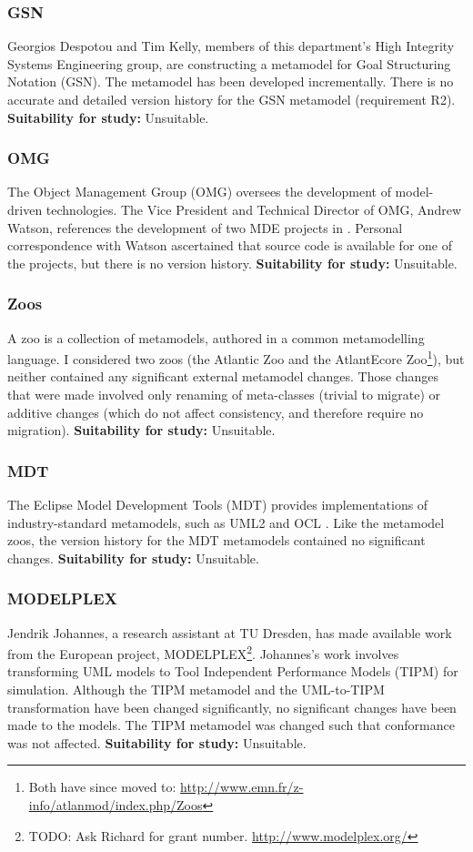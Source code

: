\subsubsection{GSN}
\label{par:gsn}
Georgios Despotou and Tim Kelly, members of this department's High Integrity Systems Engineering group, are constructing a metamodel for Goal Structuring Notation (GSN). The metamodel has been developed incrementally. There is no accurate and detailed version history for the GSN metamodel (requirement R2). \textbf{Suitability for study:} Unsuitable.

\subsubsection{OMG}
\label{par:omg}
The Object Management Group (OMG) \cite{omg} oversees the development of model-driven technologies. The Vice President and Technical Director of OMG, Andrew Watson, references the development of two MDE projects in \cite{watson08mdahistory}. Personal correspondence with Watson ascertained that source code is available for one of the projects, but there is no version history. \textbf{Suitability for study:} Unsuitable.

\subsubsection{Zoos}
\label{par:zoos}
A zoo is a collection of metamodels, authored in a common metamodelling language. I considered two zoos (the Atlantic Zoo and the AtlantEcore Zoo\footnote{Both have since moved to: \url{http://www.emn.fr/z-info/atlanmod/index.php/Zoos}}), but neither contained any significant external metamodel changes. Those changes that were made involved only renaming of meta-classes (trivial to migrate) or additive changes (which do not affect consistency, and therefore require no migration). \textbf{Suitability for study:} Unsuitable.

\subsubsection{MDT}
The Eclipse Model Development Tools (MDT) \cite{mdt} provides implementations of industry-standard metamodels, such as UML2 \cite{uml212} and OCL \cite{ocl2}. Like the metamodel zoos, the version history for the MDT metamodels contained no significant changes. \textbf{Suitability for study:} Unsuitable.

\subsubsection{MODELPLEX}
Jendrik Johannes, a research assistant at TU Dresden, has made available work from the European project, MODELPLEX\footnote{TODO: Ask Richard for grant number. \url{http://www.modelplex.org/}}. Johannes's work involves transforming UML models to Tool Independent Performance Models (TIPM) for simulation. Although the TIPM metamodel and the UML-to-TIPM transformation have been changed significantly, no significant changes have been made to the models. The TIPM metamodel was changed such that conformance was not affected. \textbf{Suitability for study:} Unsuitable.

